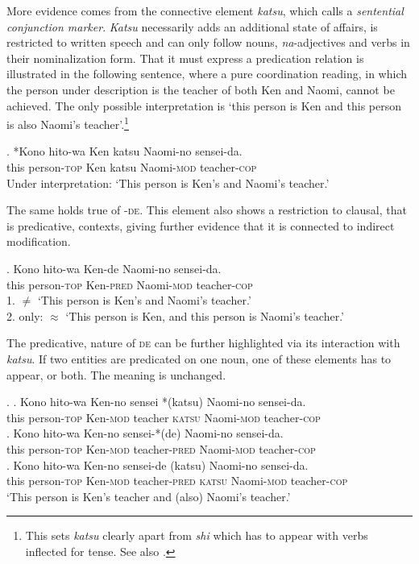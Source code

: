 \documentclass [output=book,colorlinks,citecolor=brown]{langscibook}
\begin{document}
More evidence comes from the connective element \textit{katsu}, which \citet[364]{hiraiwa:2012:mechanism} calls a \textit{sentential conjunction marker}. \textit{Katsu} necessarily adds an additional state of affairs, is restricted to written speech and can only follow nouns, \textit{na}-adjectives and verbs in their nominalization form. That it must express a predication relation is illustrated in the following sentence, where a pure coordination reading, in which the person under description is the teacher of both Ken and Naomi, cannot be achieved. The only possible interpretation is `this person is Ken and this person is also Naomi's teacher’.\footnote{This sets \textit{katsu} clearly apart from \textit{shi} which has to appear with verbs inflected for tense. See also \citet{fenger:2020:words}.} %

\exg. *Kono hito-wa Ken katsu Naomi-no sensei-da.\\
this person-\textsc{top} Ken katsu Naomi-\textsc{mod} teacher-\textsc{cop}\\
Under interpretation: `This person is Ken's and Naomi's teacher.’

The same holds true of -\textsc{de}. This element also shows a restriction to clausal, that is predicative, contexts, giving further evidence that it is connected to indirect modification.


\exg. Kono hito-wa Ken-de Naomi-no sensei-da.\\
this person-\textsc{top} Ken-\textsc{pred} Naomi-\textsc{mod} teacher-\textsc{cop}\\
1. $\neq$ `This person is Ken's and Naomi's teacher.’\\
2. only: $\approx$ `This person is Ken, and this person is Naomi’s teacher.’

The predicative, nature of \textsc{de} can be further highlighted via its interaction with \textit{katsu}. If two entities are predicated on one noun, one of these elements has to appear, or both. The meaning is unchanged. %

\ex. \ag. Kono hito-wa Ken-no sensei *(katsu) Naomi-no sensei-da.\\
this person-\textsc{top} Ken-\textsc{mod} teacher \textsc{katsu} Naomi-\textsc{mod} teacher-\textsc{cop}\\
\bg. Kono hito-wa Ken-no sensei-*(de) Naomi-no sensei-da.\\
this person-\textsc{top} Ken-\textsc{mod} teacher-\textsc{pred} Naomi-\textsc{mod} teacher-\textsc{cop}\\
\cg. Kono hito-wa Ken-no sensei-de (katsu) Naomi-no sensei-da.\\
this person-\textsc{top} Ken-\textsc{mod} teacher-\textsc{pred} \textsc{katsu} Naomi-\textsc{mod} teacher-\textsc{cop}\\
`This person is Ken's teacher and (also) Naomi's teacher.’ \\ \null \hfill \citep[364–365]{hiraiwa:2012:mechanism}
\end{document}
